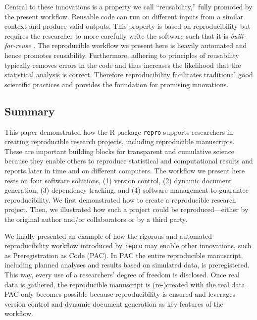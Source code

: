 \documentclass[psych,tutorial,accept,moreauthors,pdftex]{Definitions/mdpi}
\begin{document}
\begin{paracol}{2}
Central to these innovations is a property we call ``reusability,''
fully promoted by the present workflow. Reusable code can run on
different inputs from a similar context and produce valid outputs. This
property is based on reproducibility but requires the researcher to more
carefully write the software
\citep{lanerganSoftwareEngineeringReusable1989} such that it is
\emph{built-for-reuse}
\citep{al-badareenReusableSoftwareComponents2010}. The reproducible
workflow we present here is heavily automated and hence promotes
reusability. Furthermore, adhering to principles of reusability
typically removes errors in the code and thus increases the likelihood
that the statistical analysis is correct. Therefore reproducibility
facilitates traditional good scientific practices and provides the
foundation for promising innovations.

\subsection{Summary}\label{summary-1}

This paper demonstrated how the R package \texttt{repro} supports
researchers in creating reproducible research projects, including
reproducible manuscripts. These are important building blocks for
transparent and cumulative science because they enable others to
reproduce statistical and computational results and reports later in
time and on different computers. The workflow we present here rests on
four software solutions, (1) version control, (2) dynamic document
generation, (3) dependency tracking, and (4) software management to
guarantee reproducibility. We first demonstrated how to create a
reproducible research project. Then, we illustrated how such a project
could be reproduced---either by the original author and/or collaborators
or by a third party.

We finally presented an example of how the rigorous and automated
reproducibility workflow introduced by \texttt{repro} may enable other
innovations, such as Preregistration as Code (PAC). In PAC the entire
reproducible manuscript, including planned analyses and results based on
simulated data, is preregistered. This way, every use of a researchers'
degree of freedom is disclosed. Once real data is gathered, the
reproducible manuscript is (re-)created with the real data. PAC only
becomes possible because reproducibility is ensured and leverages
version control and dynamic document generation as key features of the
workflow.


\end{paracol}
\end{document}
